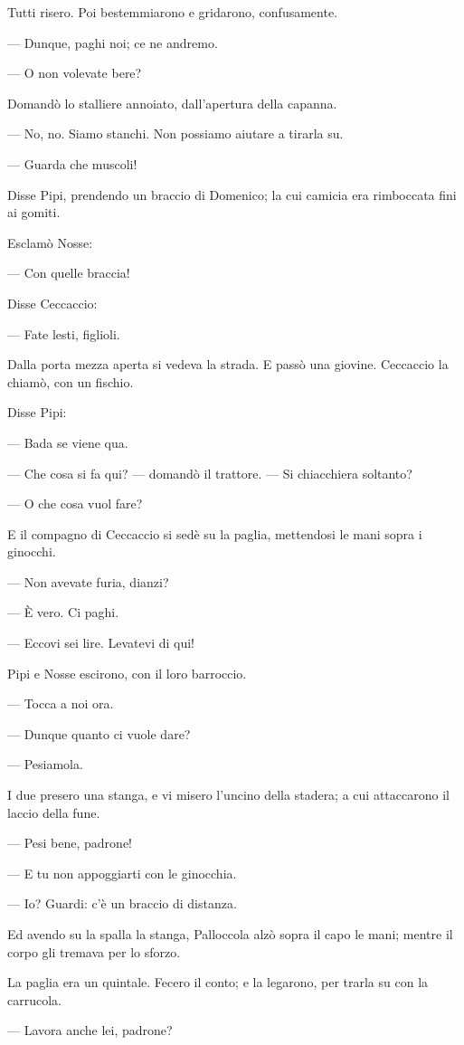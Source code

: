 Tutti risero. Poi bestemmiarono e gridarono, confusamente.

— Dunque, paghi noi; ce ne andremo.

— O non volevate bere?

Domandò lo stalliere annoiato, dall’apertura della capanna.

— No, no. Siamo stanchi. Non possiamo aiutare a tirarla su.

— Guarda che muscoli!

Disse Pipi, prendendo un braccio di Domenico; la cui camicia era rimboccata fini ai gomiti.

Esclamò Nosse:

— Con quelle braccia!

Disse Ceccaccio:

— Fate lesti, figlioli.

Dalla porta mezza aperta si vedeva la strada. E passò una giovine. Ceccaccio la chiamò, con un fischio.

Disse Pipi:

— Bada se viene qua.

— Che cosa si fa qui? — domandò il trattore. — Si chiacchiera soltanto?

— O che cosa vuol fare?

E il compagno di Ceccaccio si sedè su la paglia, mettendosi le mani sopra i ginocchi.

— Non avevate furia, dianzi?

— È vero. Ci paghi.

— Eccovi sei lire. Levatevi di qui!

Pipi e Nosse escirono, con il loro barroccio.

— Tocca a noi ora.

— Dunque quanto ci vuole dare?

— Pesiamola.

I due presero una stanga, e vi misero l’uncino della stadera; a cui attaccarono il laccio della fune.

— Pesi bene, padrone!

— E tu non appoggiarti con le ginocchia.

— Io? Guardi: c’è un braccio di distanza.

Ed avendo su la spalla la stanga, Palloccola alzò sopra il capo le mani; mentre il corpo gli tremava per lo sforzo.

La paglia era un quintale. Fecero il conto; e la legarono, per trarla su con la carrucola.

— Lavora anche lei, padrone?

